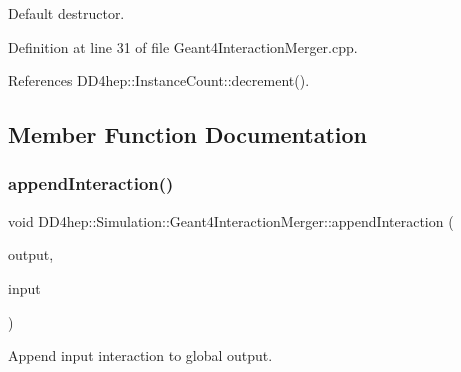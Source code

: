 Default destructor. 



Definition at line 31 of file Geant4\+Interaction\+Merger.\+cpp.



References D\+D4hep\+::\+Instance\+Count\+::decrement().



\subsection{Member Function Documentation}
\hypertarget{class_d_d4hep_1_1_simulation_1_1_geant4_interaction_merger_a224d85d05dcd541ef4185e0a91ade714}{}\label{class_d_d4hep_1_1_simulation_1_1_geant4_interaction_merger_a224d85d05dcd541ef4185e0a91ade714} 
\subsubsection{\texorpdfstring{append\+Interaction()}{appendInteraction()}}
{\footnotesize\ttfamily void D\+D4hep\+::\+Simulation\+::\+Geant4\+Interaction\+Merger\+::append\+Interaction (\begin{DoxyParamCaption}\item[{\hyperlink{class_d_d4hep_1_1_simulation_1_1_geant4_primary_interaction}{Geant4\+Primary\+Interaction} $\ast$}]{output,  }\item[{\hyperlink{class_d_d4hep_1_1_simulation_1_1_geant4_primary_interaction}{Geant4\+Primary\+Interaction} $\ast$}]{input }\end{DoxyParamCaption})\hspace{0.3cm}{\ttfamily [private]}}



Append input interaction to global output. 

\hypertarget{class_d_d4hep_1_1_simulation_1_1_geant4_interaction_merger_a5af2cee708859468f78130560ffa4a6e}{}\label{class_d_d4hep_1_1_simulation_1_1_geant4_interaction_merger_a5af2cee708859468f78130560ffa4a6e} 
